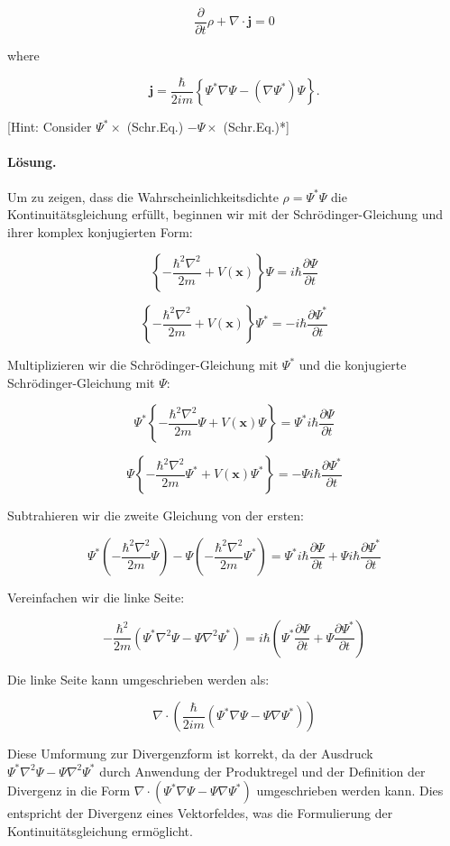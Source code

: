 \documentclass[11pt,a4paper]{article}
\begin{document}
$$
\frac{\partial}{\partial t} \rho+\nabla \cdot \mathbf{j}=0
$$

where

$$
\mathbf{j}=\frac{\hbar}{2 i m}\left\{\Psi^* \nabla \Psi-\left(\nabla \Psi^*\right) \Psi\right\} .
$$

[Hint: Consider $\Psi^* \times$ (Schr.Eq.) $-\Psi \times$ (Schr.Eq.)*]

\paragraph{Lösung.}
Um zu zeigen, dass die Wahrscheinlichkeitsdichte \(\rho = \Psi^* \Psi\) die Kontinuitätsgleichung erfüllt, beginnen wir mit der Schrödinger-Gleichung und ihrer komplex konjugierten Form:

\[
\left\{-\frac{\hbar^2 \nabla^2}{2 m} + V(\mathbf{x})\right\} \Psi = i \hbar \frac{\partial \Psi}{\partial t}
\]

\[
\left\{-\frac{\hbar^2 \nabla^2}{2 m} + V(\mathbf{x})\right\} \Psi^* = -i \hbar \frac{\partial \Psi^*}{\partial t}
\]

Multiplizieren wir die Schrödinger-Gleichung mit \(\Psi^*\) und die konjugierte Schrödinger-Gleichung mit \(\Psi\):

\[
\Psi^* \left\{-\frac{\hbar^2 \nabla^2}{2 m} \Psi + V(\mathbf{x}) \Psi\right\} = \Psi^* i \hbar \frac{\partial \Psi}{\partial t}
\]

\[
\Psi \left\{-\frac{\hbar^2 \nabla^2}{2 m} \Psi^* + V(\mathbf{x}) \Psi^*\right\} = -\Psi i \hbar \frac{\partial \Psi^*}{\partial t}
\]

Subtrahieren wir die zweite Gleichung von der ersten:

\[
\Psi^* \left(-\frac{\hbar^2 \nabla^2}{2 m} \Psi\right) - \Psi \left(-\frac{\hbar^2 \nabla^2}{2 m} \Psi^*\right) = \Psi^* i \hbar \frac{\partial \Psi}{\partial t} + \Psi i \hbar \frac{\partial \Psi^*}{\partial t}
\]

Vereinfachen wir die linke Seite:

\[
-\frac{\hbar^2}{2 m} \left(\Psi^* \nabla^2 \Psi - \Psi \nabla^2 \Psi^*\right) = i \hbar \left(\Psi^* \frac{\partial \Psi}{\partial t} + \Psi \frac{\partial \Psi^*}{\partial t}\right)
\]

Die linke Seite kann umgeschrieben werden als:

\[
\nabla \cdot \left(\frac{\hbar}{2 i m} \left(\Psi^* \nabla \Psi - \Psi \nabla \Psi^*\right)\right)
\]

Diese Umformung zur Divergenzform ist korrekt, da der Ausdruck \(\Psi^* \nabla^2 \Psi - \Psi \nabla^2 \Psi^*\) durch Anwendung der Produktregel und der Definition der Divergenz in die Form \(\nabla \cdot (\Psi^* \nabla \Psi - \Psi \nabla \Psi^*)\) umgeschrieben werden kann. Dies entspricht der Divergenz eines Vektorfeldes, was die Formulierung der Kontinuitätsgleichung ermöglicht.
\end{document}
